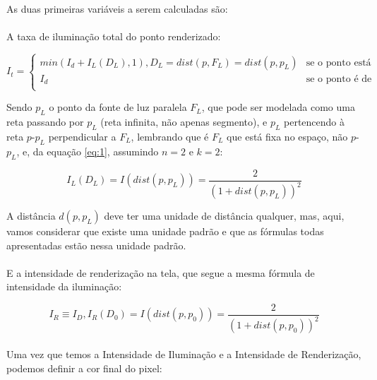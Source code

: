 \documentclass{article}
\begin{document}
	\paragraph{}
	As duas primeiras variáveis a serem calculadas são:
	
	\paragraph{}
	A taxa de iluminação total do ponto renderizado: 

	\begin{equation} \label{eq:2}
		I_t =  \begin{cases} 
			min(I_d + I_L(D_L), 1), D_L = dist(p, F_L) = dist(p, p_L) & \text{se o ponto está iluminado} \\
			I_d & \text{se o ponto é de sombra} \\
		\end{cases} 
	\end{equation}

	Sendo $p_L$ o ponto da fonte de luz paralela $F_L$, que pode ser modelada como uma reta passando por $p_L$ (reta infinita, não apenas segmento), e $p_L$ pertencendo à reta $p$-$p_L$ perpendicular a $F_L$, lembrando que é $F_L$ que está fixa no espaço, não $p$-$p_L$, e, da equação \ref{eq:1}, assumindo $n = 2$ e $k = 2$:
	
	\begin{equation} \label{eq:3}
		I_L(D_L) = I(dist(p, p_L)) =  \frac{2}{(1+dist(p, p_L))^2}
	\end{equation}
	
	A distância $d(p, p_L)$ deve ter uma unidade de distância qualquer, mas, aqui, vamos considerar que existe uma unidade padrão e que as fórmulas todas apresentadas estão nessa unidade padrão.
	
	\paragraph{}
	E a intensidade de renderização na tela, que segue a mesma fórmula de intensidade da iluminação:
	
	\begin{equation} \label{eq:4}
		I_R \equiv I_D, I_R(D_0) = I(dist(p, p_0)) = \frac{2}{(1+dist(p, p_0))^2}
	\end{equation}
	
	\paragraph{}
	Uma vez que temos a Intensidade de Iluminação e a Intensidade de Renderização, podemos definir a cor final do pixel:
	
\end{document}
